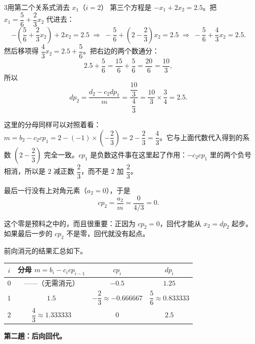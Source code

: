 \begin{stepbox}{3}{用第二个关系式消去 $x_1$（$i=2$）}
第三个方程是 $-x_1+2x_2=2.5$。把 $x_1=\dfrac56+\dfrac23x_2$ 代进去：
\begin{equation}
-\left(\frac56+\frac23x_2\right)+2x_2=2.5
\;\Longrightarrow\;
-\frac56+\left(2-\frac23\right)x_2=2.5
\;\Longrightarrow\;
-\frac56+\frac43x_2=2.5 .
\label{eq:p5-ex3}
\end{equation}
然后移项得 $\dfrac43x_2=2.5+\dfrac56$。把右边的两个数通分：
\begin{equation}
2.5+\frac56=\frac{15}{6}+\frac56=\frac{20}{6}=\frac{10}{3},
\label{eq:p5-ex3v}
\end{equation}
所以
\begin{equation}
dp_2=\frac{d_2-c_2dp_1}{m}=\frac{\dfrac{10}{3}}{\dfrac43}=\frac{10}{3}\times\frac34=2.5 .
\end{equation}

这里的分母同样可以对照着看：$m=b_2-c_2cp_1=2-(-1)\times\left(-\dfrac23\right)=2-\dfrac23=\dfrac43$。它与上面代数代入得到的系数 $\left(2-\dfrac23\right)$ 完全一致。$cp_1$ 是负数这件事在这里起了作用：$-c_2cp_1$ 里的两个负号相消，所以是 $2$ 减正数 $\dfrac23$，而不是 $2$ 加 $\dfrac23$。

最后一行没有上对角元素（$a_2=0$），于是
\begin{equation}
cp_2=\frac{a_2}{m}=\frac{0}{4/3}=0 .
\label{eq:p5-ex3c}
\end{equation}

这个零是预料之中的，而且很重要：正因为 $cp_2=0$，回代才能从 $x_2=dp_2$ 起步。如果最后一步的 $cp_2$ 不是零，回代就没有起点。
\end{stepbox}

前向消元的结果汇总如下。

\begin{center}
\begin{tabular}{@{}cccc@{}}
\toprule
$i$ & 分母 $m=b_i-c_icp_{i-1}$ & $cp_i$ & $dp_i$ \\
\midrule
$0$ & ——（无需消元） & $-0.5$ & $1.25$ \\
$1$ & $1.5$ & $-\dfrac23\approx-0.666667$ & $\dfrac56\approx0.833333$ \\
$2$ & $\dfrac43\approx1.333333$ & $0$ & $2.5$ \\
\bottomrule
\end{tabular}
\end{center}

\textbf{第二趟：后向回代。}

